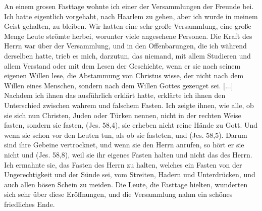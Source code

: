 
An einem grosen Fasttage wohnte ich einer der Versammlungen 
der Freunde bei. Ich hatte eigentlich vorgehabt, nach
Haarlem zu gehen, aber ich wurde in meinem Geist gehalten, zu
bleiben. Wir hatten eine sehr große Versammlung, eine große
Menge Leute strömte herbei, worunter viele angesehene Personen.
Die Kraft des Herrn war über der Versammlung, und in den
Offenbarungen, die ich während derselben 
hatte, trieb es mich,
darzutun, das niemand, mit allem Studieren und allem Verstand
oder mit dem Lesen der Geschichte, wenn er sie nach seinem eigenen
Willen lese, die Abstammung von Christus wisse, der nicht nach
dem Willen eines Menschen, sondern nach dem Willen Gottes
gezeuget sei. [...] Nachdem ich ihnen das ausführlich erklärt hatte,
erklärte ich ihnen den Unterschied zwischen wahrem und falschem
Fasten. Ich zeigte ihnen, wie alle, ob sie sich 
nun Christen, Juden oder Türken nennen, 
nicht in der rechten Weise fasten, sondern sie
fasten, 
(Jes. 58,4), sie erheben nicht 
reine Hände zu Gott. Und wenn sie
schon vor den Leuten tun, als ob sie fasteten, und (Jes. 58,5). Darum sind 
ihre Gebeine vertrocknet,
und wenn sie den Herrn anrufen, so hört er sie nicht und (Jes. 58,8), 
weil sie ihr eigenes Fasten
halten und nicht das des Herrn. Ich ermahnte sie, das Fasten
des Herrn zu halten, welches ein Fasten von der Ungerechtigkeit
und der Sünde sei, vom Streiten, Hadern und Unterdrücken, und
auch allen bösen Schein zu meiden. Die Leute, die Fasttage
hielten, wunderten sich sehr über diese Eröffnungen, und die 
Versammlung nahm ein schönes friedliches Ende.

